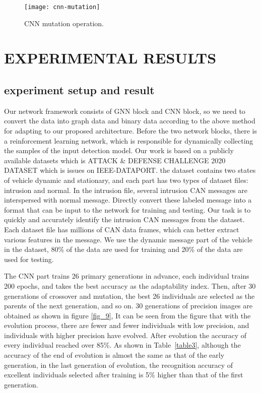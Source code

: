 \documentclass[lettersize,journal]{IEEEtran}
\begin{document}
\begin{figure}[!t]
\centering
\texttt{[image: cnn-mutation]}
\caption{CNN mutation operation.}
\label{fig_8}
\end{figure}

\section{EXPERIMENTAL RESULTS}\label{section_result}
\subsection{experiment setup and result}
Our network framework consists of GNN block and CNN block, so we need to convert the data into graph data and binary data according to the above method for adapting to our proposed architecture. Before the two network blocks, there is a reinforcement learning network, which is responsible for dynamically collecting the samples of the input detection model.
Our work is based on a publicly available datasets which is ATTACK \& DEFENSE CHALLENGE 2020 DATASET \cite{74} which is issues on IEEE-DATAPORT. the dataset contains two states of vehicle dynamic and stationary, and each part has two types of dataset files: intrusion and normal. In the intrusion file, several intrusion CAN messages are interspersed with normal message. Directly convert these labeled message into a format that can be input to the network for training and testing. Our task is to quickly and accurately identify the intrusion CAN messages from the dataset. Each dataset file has millions of CAN data frames, which can better extract various features in the message. We use the dynamic message part of the vehicle in the dataset, 80\% of the data are used for training and 20\% of the data are used for testing.

The CNN part trains 26 primary generations in advance, each individual trains 200 epochs, and takes the best accuracy as the adaptability index. Then, after 30 generations of crossover and mutation, the best 26 individuals are selected as the parents of the next generation, and so on. 30 generations of precision images are obtained as shown in figure \ref{fig_9}, It can be seen from the figure that with the evolution process, there are fewer and fewer individuals with low precision, and individuals with higher precision have evolved. After evolution the accuracy of every individual reached over 85\%. As shown in Table~\ref{table3}, although the accuracy of the end of evolution is almost the same as that of the early generation, in the last generation of evolution, the recognition accuracy of excellent individuals selected after training is 5\% higher than that of the first generation.
\end{document}
